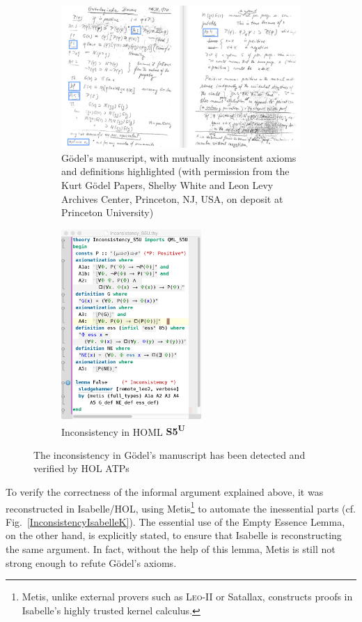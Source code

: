 \documentclass{llncs}
\newcommand{\logic}[1]{\textbf{#1}\xspace}
\newcommand{\SFiveU}{\logic{S5\textsuperscript{U}}}
\begin{document}
\begin{figure}[t]
  \centering
  \begin{subfigure}[t]{0.715\textwidth}
    \includegraphics[width=\textwidth]{./Manuscript2.png}
    \caption{G\"{o}del's manuscript, with mutually inconsistent axioms and
      definitions highlighted (with permission from the Kurt G\"odel Papers, Shelby White and Leon Levy Archives Center, Princeton, NJ, USA, on deposit at Princeton University)} \label{GoedelScript} 
  \end{subfigure}
   \begin{subfigure}[t]{0.28\textwidth}
     \includegraphics[width=\textwidth,height=7.2cm]{./Inconsistency_S5U_direct.png}
     \caption{Inconsistency in HOML \SFiveU} \label{Inconsistency_S5U} 
   \end{subfigure}
 \caption{The inconsistency in G\"{o}del's manuscript has been
   detected and verified by HOL ATPs} 
\end{figure}
To verify the correctness of the informal argument explained above, it
was reconstructed in Isabelle/HOL, using Metis\footnote{Metis, unlike
  external provers such as \textsc{Leo-II} or Satallax, 
  constructs proofs in Isabelle's highly trusted kernel calculus.} to automate the
inessential parts (cf. Fig.~\ref {InconsistencyIsabelleK}). The essential use of the Empty Essence Lemma, on
the other hand, is explicitly stated, to ensure that Isabelle is
reconstructing the same argument. In fact, without the help of this
lemma, Metis is still not strong enough to refute G\"odel's
axioms.
\end{document}
